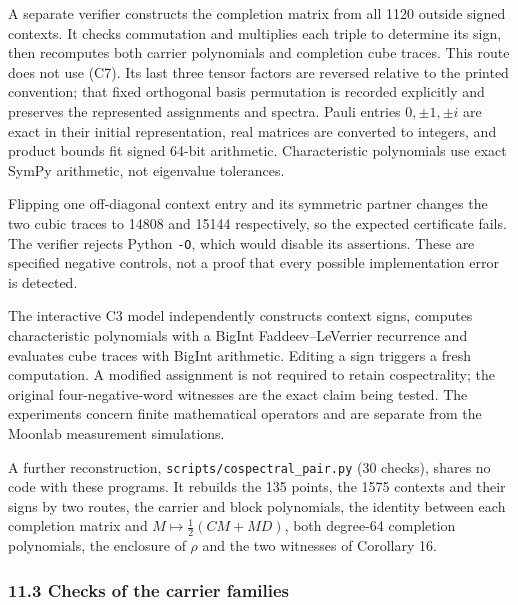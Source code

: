 \documentclass[11pt,a4paper]{article}
\begin{document}
A separate verifier constructs the completion matrix from all 1120 outside signed contexts. It
checks commutation and multiplies each triple to determine its sign, then recomputes both carrier
polynomials and completion cube traces. This route does not use (C7). Its last three tensor factors
are reversed relative to the printed convention; that fixed orthogonal basis permutation is recorded
explicitly and preserves the represented assignments and spectra. Pauli entries \(0,\pm1,\pm i\) are
exact in their initial representation, real matrices are converted to integers, and product bounds
fit signed 64-bit arithmetic. Characteristic polynomials use exact SymPy arithmetic, not eigenvalue
tolerances.

Flipping one off-diagonal context entry and its symmetric partner changes the two cubic traces to
14808 and 15144 respectively, so the expected certificate fails. The verifier rejects Python \texttt{-O},
which would disable its assertions. These are specified negative controls, not a proof that every
possible implementation error is detected.

The interactive C3 model independently constructs context signs, computes characteristic polynomials
with a BigInt Faddeev--LeVerrier recurrence and evaluates cube traces with BigInt arithmetic. Editing a
sign triggers a fresh computation. A modified assignment is not required to retain cospectrality;
the original four-negative-word witnesses are the exact claim being tested. The experiments concern
finite mathematical operators and are separate from the Moonlab measurement simulations.

A further reconstruction, \nolinkurl{scripts/cospectral_pair.py} (30 checks), shares no code with these
programs. It rebuilds the 135 points, the 1575 contexts and their signs by two routes, the carrier and
block polynomials, the identity between each completion matrix and \(M\mapsto\frac12(CM+MD)\), both degree-64
completion polynomials, the enclosure of \(\rho\) and the two witnesses of Corollary 16.

\subsubsection{11.3 Checks of the carrier families}\label{113-checks-of-the-carrier-families}
\end{document}
